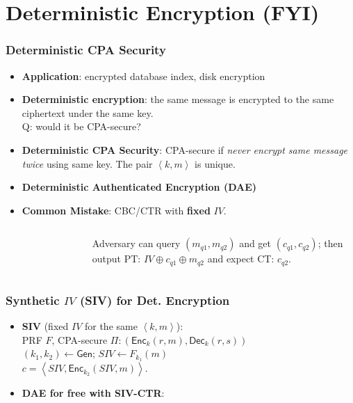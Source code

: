 \section{Deterministic Encryption (FYI)}
\begin{frame}\frametitle{Deterministic CPA Security}
\begin{itemize}
\item \textbf{Application}: encrypted database index, disk encryption
\item \textbf{Deterministic encryption}: the same message is encrypted to the same ciphertext under the same key. \\ \alert{Q: would it be  CPA-secure?}
\item \textbf{Deterministic CPA Security}: CPA-secure if \emph{never encrypt same message twice} using same key. The pair $\left<k,m\right>$ is unique.
\item \textbf{Deterministic Authenticated Encryption (DAE)}
\item \textbf{\alert{Common Mistake}}: CBC/CTR with \textbf{fixed} $IV$.
\begin{columns}[C]
\begin{figure}
\begin{center}

\end{center}
\end{figure}
Adversary can query $(m_{q1}, m_{q2})$ and get $(c_{q1}, c_{q2})$; then output PT: $ IV\oplus c_{q1} \oplus m_{q2}$ and expect CT: $c_{q2}$.
\end{columns}
\end{itemize}
\end{frame}
\begin{frame}\frametitle{Synthetic $IV$ (SIV) for Det. Encryption}
\begin{itemize}
\item \textbf{SIV} (fixed $IV$ for the same $\left<k,m\right>$): \\
PRF $F$, CPA-secure $\Pi:(\mathsf{Enc}_k(r,m), \mathsf{Dec}_k(r,s))$\\ 
$(k_1,k_2) \gets \mathsf{Gen}$; $SIV \gets F_{k_1}(m)$\\ 
$c = \left<SIV,\mathsf{Enc}_{k_2}(SIV,m) \right>$.
\item \textbf{DAE for free with SIV-CTR}: %
\begin{figure}
\begin{center}

\end{center}
\end{figure}
\end{itemize}
\end{frame}
